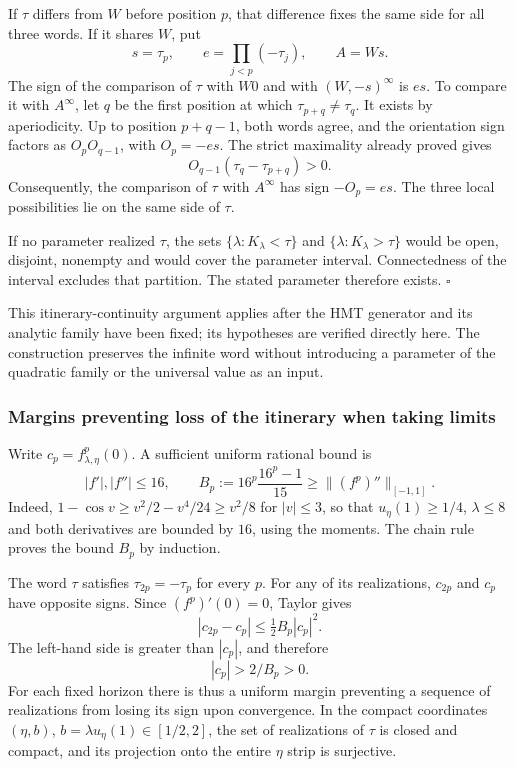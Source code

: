 If \(\tau\) differs from \(W\) before position \(p\), that difference fixes the same side for all three words. If it shares \(W\), put
\[
s=\tau_p,\qquad e=\prod_{j<p}(-\tau_j),\qquad A=Ws.
\]
The sign of the comparison of \(\tau\) with \(W0\) and with \((W,-s)^\infty\) is \(es\). To compare it with \(A^\infty\), let \(q\) be the first position at which \(\tau_{p+q}\ne\tau_q\). It exists by aperiodicity. Up to position \(p+q-1\), both words agree, and the orientation sign factors as \(O_pO_{q-1}\), with \(O_p=-es\). The strict maximality already proved gives
\[
O_{q-1}(\tau_q-\tau_{p+q})>0.
\]
Consequently, the comparison of \(\tau\) with \(A^\infty\) has sign \(-O_p=es\). The three local possibilities lie on the same side of \(\tau\).

If no parameter realized \(\tau\), the sets \(\{\lambda:K_\lambda<\tau\}\) and \(\{\lambda:K_\lambda>\tau\}\) would be open, disjoint, nonempty and would cover the parameter interval. Connectedness of the interval excludes that partition. The stated parameter therefore exists. \(\square\)

This itinerary-continuity argument applies after the HMT generator and its analytic family have been fixed; its hypotheses are verified directly here. The construction preserves the infinite word without introducing a parameter of the quadratic family or the universal value as an input.

\subsubsection{Margins preventing loss of the itinerary when taking limits}
\label{hmtfg:prolongacion:6.2}

Write \(c_p=f_{\lambda,\eta}^p(0)\). A sufficient uniform rational bound is
\[
|f'|,|f''|\le16,\qquad
B_p:=16^p\frac{16^p-1}{15}\ge\|(f^p)''\|_{[-1,1]}.
\]
Indeed, \(1-\cos v\ge v^2/2-v^4/24\ge v^2/8\) for \(|v|\le3\), so that \(u_\eta(1)\ge1/4\), \(\lambda\le8\) and both derivatives are bounded by \(16\), using the moments. The chain rule proves the bound \(B_p\) by induction.

The word \(\tau\) satisfies \(\tau_{2p}=-\tau_p\) for every \(p\). For any of its realizations, \(c_{2p}\) and \(c_p\) have opposite signs. Since \((f^p)'(0)=0\), Taylor gives
\[
|c_{2p}-c_p|\le\tfrac12B_p|c_p|^2.
\]
The left-hand side is greater than \(|c_p|\), and therefore
\[
\boxed{|c_p|>2/B_p>0.}
\]
For each fixed horizon there is thus a uniform margin preventing a sequence of realizations from losing its sign upon convergence. In the compact coordinates \((\eta,b)\), \(b=\lambda u_\eta(1)\in[1/2,2]\), the set of realizations of \(\tau\) is closed and compact, and its projection onto the entire \(\eta\) strip is surjective.

